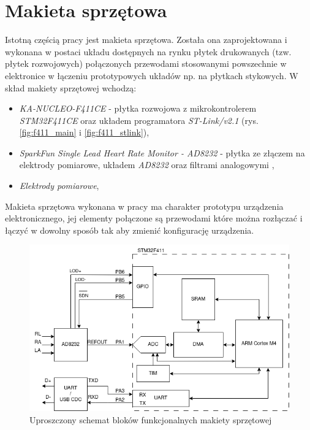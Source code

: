 
\chapter{Makieta sprzętowa}

Istotną częścią pracy jest makieta sprzętowa. Została ona zaprojektowana i wykonana w postaci układu dostępnych na rynku płytek drukowanych
(tzw. płytek rozwojowych) połączonych przewodami stosowanymi powszechnie w elektronice w łączeniu prototypowych układów np. na płytkach stykowych. 
W skład makiety sprzętowej wchodzą:

\begin{itemize}

    \item \textit{KA-NUCLEO-F411CE} - płytka rozwojowa z mikrokontrolerem \textit{STM32F411CE} oraz układem programatora \textit{ST-Link/v2.1} \cite{NUCLEO} (rys. \ref{fig:f411_main} i \ref{fig:f411_stlink}),

    \item \textit{SparkFun Single Lead Heart Rate Monitor - AD8232} - płytka ze złączem na elektrody pomiarowe, układem \textit{AD8232} oraz filtrami analogowymi \cite{AD8232BS},

    \item \textit{Elektrody pomiarowe},

\end{itemize}

Makieta sprzętowa wykonana w pracy ma charakter prototypu urządzenia elektronicznego, 
jej elementy połączone są przewodami które można rozłączać i łączyć w dowolny sposób tak aby zmienić konfigurację urządzenia.

\begin{figure}[h!]
    \centering 
    \includegraphics[scale=0.7]{pl/media/hw_blocks_simplified.png}
    \caption{Uproszczony schemat bloków funkcjonalnych makiety sprzętowej}
    \label{fig:hw_hl}
\end{figure}

